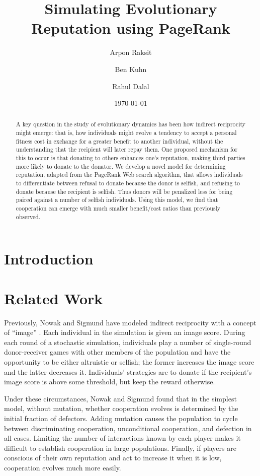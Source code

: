 \documentclass{amsart}
\title{Simulating Evolutionary Reputation using PageRank}
\author{Arpon Raksit \and Ben Kuhn \and Rahul Dalal}
\date{\today}
\begin{document}
\begin{abstract}
A key question in the study of evolutionary dynamics has been how indirect reciprocity might emerge: that is, how individuals might evolve a tendency to accept a personal fitness cost in exchange for a greater benefit to another individual, without the understanding that the recipient will later repay them. One proposed mechanism for this to occur is that donating to others enhances one's reputation, making third parties more likely to donate to the donator. We develop a novel model for determining reputation, adapted from the PageRank Web search algorithm, that allows individuals to differentiate between refusal to donate because the donor is selfish, and refusing to donate because the recipient is selfish. Thus donors will be penalized less for being paired against a number of selfish individuals. Using this model, we find that cooperation can emerge with much smaller benefit/cost ratios than previously observed.
\end{abstract}

\maketitle

\section{Introduction}

\section{Related Work}

Previously, Nowak and Sigmund have modeled indirect reciprocity with a concept of ``image'' \cite{nowak_evolution_1998}. Each individual in the simulation is given an image score. During each round of a stochastic simulation, individuals play a number of single-round donor-receiver games with other members of the population and have the opportunity to be either altruistic or selfish; the former increases the image score and the latter decreases it. Individuals’ strategies are to donate if the recipient’s image score is above some threshold, but keep the reward otherwise.

Under these circumstances, Nowak and Sigmund found that in the simplest model, without mutation, whether cooperation evolves is determined by the initial fraction of defectors. Adding mutation causes the population to cycle between discriminating cooperation, unconditional cooperation, and defection in all cases. Limiting the number of interactions known by each player makes it difficult to establish cooperation in large populations. Finally, if players are conscious of their own reputation and act to increase it when it is low, cooperation evolves much more easily. 
\end{document}
